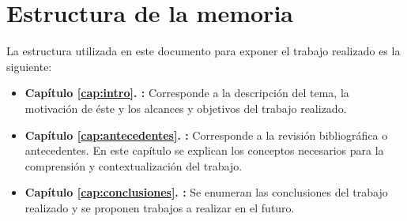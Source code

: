 \section{Estructura de la memoria}\label{cap:intro:estructura}
La estructura utilizada en este documento para exponer el trabajo realizado es la siguiente:

\begin{itemize}
	\item \textbf{Capítulo \ref{cap:intro}. :} Corresponde a la descripción del tema, la motivación de éste y los alcances y objetivos del trabajo realizado.
	
	\item \textbf{Capítulo \ref{cap:antecedentes}. :} Corresponde a la revisión bibliográfica o antecedentes. En este capítulo se explican los conceptos necesarios para la comprensión y contextualización del trabajo.
	
	\item \textbf{Capítulo \ref{cap:conclusiones}. :}	Se enumeran las conclusiones del trabajo realizado y se proponen trabajos a realizar en el futuro.
\end{itemize}